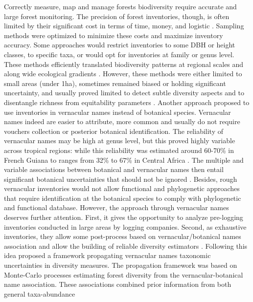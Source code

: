 \documentclass[
  11pt,
  french,
  A4paper,
  extrafontsizes,onecolumn,openright
  ]{memoir}
\begin{document}
Correctly measure, map and manage forests biodiversity require accurate
and large forest monitoring. The precision of forest inventories,
though, is often limited by their significant cost in terms of time,
money, and logistic \autocites{Feeley2011}{Baraloto2013}. Sampling
methods were optimized to minimize these costs and maximize inventory
accuracy. Some approaches would restrict inventories to some DBH or
height classes, to specific taxa, or would opt for inventories at family
or genus level. These methods efficiently translated biodiversity
patterns at regional scales and along wide ecological gradients
\autocites{Higgins2004}{Pos2014}. However, these methods were either
limited to small areas (under 1ha), sometimes remained biased or holding
significant uncertainty, and usually proved limited to detect subtle
diversity aspects and to disentangle richness from equitability
parameters \autocites{Vellend2008}{Prance1994}. Another approach
proposed to use inventories in vernacular names instead of botanical
species. Vernacular names indeed are easier to attribute, more common
and usually do not require vouchers collection or posterior botanical
identification. The reliability of vernacular names may be high at genus
level, but this proved highly variable across tropical regions: while
this reliability was estimated around 60-70\% in French Guiana
\autocites{Hawes2012}{Guitet2014b} to ranges from 32\% to 67\% in
Central Africa \autocite{Rejou-Mechain2011}. The multiple and variable
associations between botanical and vernacular names then entail
significant botanical uncertainties that should not be ignored
\autocite{Oldeman1968}. Besides, rough vernacular inventories would not
allow functional and phylogenetic approaches that require identification
at the botanical species to comply with phylogenetic and functional
database. However, the approach through vernacular names deserves
further attention. First, it gives the opportunity to analyze
pre-logging inventories conducted in large areas by logging companies.
Second, as exhaustive inventories, they allow some post-process based on
vernacular/botanical names association and allow the building of
reliable diversity estimators
\autocites{TerSteege2006}{Feldpausch2006}{Rejou-Mechain2008}. Following
this idea \textcite{Guitet2014b} proposed a framework propagating
vernacular names taxonomic uncertainties in diversity measures. The
propagation framework was based on Monte-Carlo processes estimating
forest diversity from the vernacular-botanical name association. These
associations combined prior information from both general taxa-abundance
\end{document}
